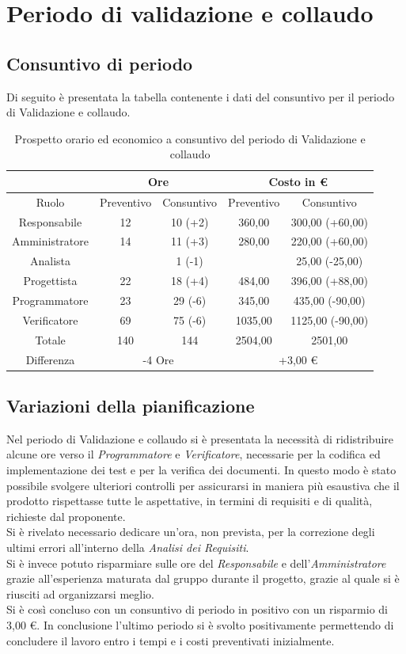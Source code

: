 \documentclass[./PianodiProgetto.tex]{subfiles}
\begin{document}
\section{Periodo di validazione e collaudo}
\subsection{Consuntivo di periodo}
Di seguito è presentata la tabella contenente i dati del consuntivo per il periodo di Validazione e collaudo.

\begin{table}[H]
	\centering
	\begin{tabular}{|c|c|c|c|c|}
		\hline
		& \multicolumn{2}{c|}{Ore} & \multicolumn{2}{c|}{Costo in \euro{}}  \\ \hline
		Ruolo&Preventivo&Consuntivo&Preventivo&Consuntivo \\ \hline
		Responsabile&12&10 (+2)&360,00&300,00  (+60,00)  \\ \hline
		Amministratore&14&11 (+3)&280,00&220,00 (+60,00)  \\ \hline
		Analista& & 1 (-1) & & 25,00 (-25,00) \\ \hline
		Progettista&22&18 (+4)&484,00&396,00 (+88,00)  \\ \hline
		Programmatore&23&29 (-6)&345,00&435,00 (-90,00)  \\ \hline
		Verificatore&69&75 (-6)&1035,00&1125,00 (-90,00)  \\ \hline
		Totale&140&144&2504,00&2501,00 \\ \hline
		Differenza& \multicolumn{2}{c|}{-4 Ore} & \multicolumn{2}{c|}{+3,00 \euro{}} \\ \hline
	\end{tabular}
	\caption{Prospetto orario ed economico a consuntivo del periodo di Validazione e collaudo}
\end{table}

\subsection{Variazioni della pianificazione}
Nel periodo di Validazione e collaudo si è presentata la necessità di ridistribuire alcune ore verso il \textit{Programmatore} e \textit{Verificatore}, necessarie per la codifica ed implementazione dei test e per la verifica dei documenti. In questo modo è stato possibile svolgere ulteriori controlli per assicurarsi in maniera più esaustiva che il prodotto rispettasse tutte le aspettative, in termini
di requisiti e di qualità, richieste dal proponente.\\
Si è rivelato necessario dedicare un'ora, non prevista, per la correzione degli ultimi errori all'interno della \textit{Analisi dei Requisiti}.\\
Si è invece potuto risparmiare sulle ore del \textit{Responsabile} e dell'\textit{Amministratore} grazie all'esperienza maturata dal gruppo durante il progetto, grazie al quale si è riusciti ad organizzarsi meglio.\\
Si è così concluso con un consuntivo di periodo in positivo con un risparmio di 3,00 \euro{}. In conclusione l'ultimo periodo si è svolto positivamente permettendo di concludere il
lavoro entro i tempi e i costi preventivati inizialmente.
\end{document}
